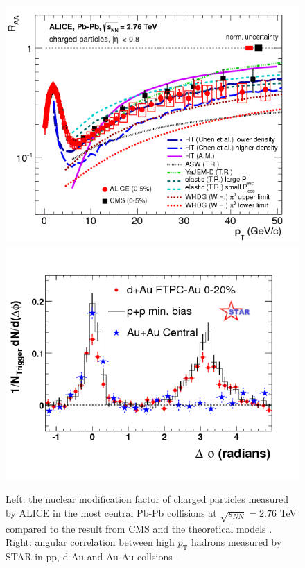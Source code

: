 \documentclass[b5paper,10pt,twoside,oldstyle,classica]{toptesi}
\newcommand{\pt}{p_\text{T}}
\begin{document}
\begin{figure}[tb]
\begin{center}
\includegraphics[scale = 0.29]{raa_charged.png}
\hspace{0cm}
\includegraphics[scale = 0.29]{jetquenching.png}
\caption{Left: the nuclear modification factor of charged particles measured by ALICE in the most central Pb-Pb collisions at $\sqrt{s_{NN}} = 2.76$ TeV compared to the result from CMS and the theoretical models \cite{Abelev:2012hxa}. Right: angular correlation between high $\pt$ hadrons measured by STAR in pp, d-Au and Au-Au collsions \cite{Adams:2006yt}.}
\label{jetquench}
\end{center}
\end{figure}
\end{document}
